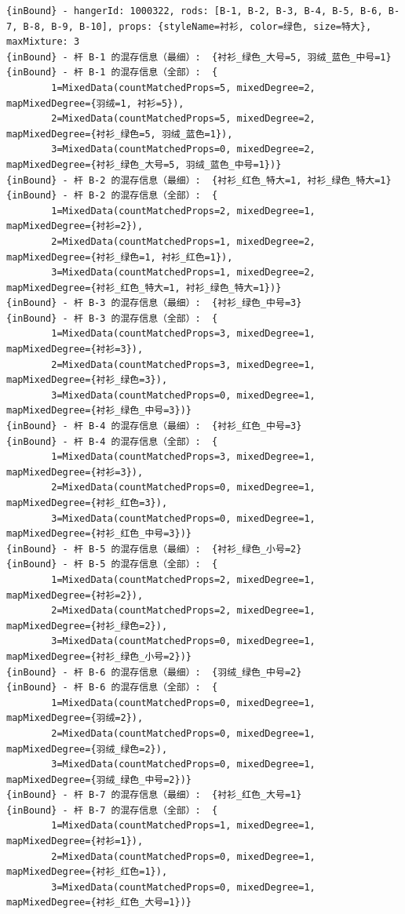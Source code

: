 {\begin{verbatim}
{inBound} - hangerId: 1000322, rods: [B-1, B-2, B-3, B-4, B-5, B-6, B-7, B-8, B-9, B-10], props: {styleName=衬衫, color=绿色, size=特大}, maxMixture: 3
{inBound} - 杆 B-1 的混存信息（最细）:  {衬衫_绿色_大号=5, 羽绒_蓝色_中号=1}
{inBound} - 杆 B-1 的混存信息（全部）:  {
		1=MixedData(countMatchedProps=5, mixedDegree=2, mapMixedDegree={羽绒=1, 衬衫=5}), 
		2=MixedData(countMatchedProps=5, mixedDegree=2, mapMixedDegree={衬衫_绿色=5, 羽绒_蓝色=1}), 
		3=MixedData(countMatchedProps=0, mixedDegree=2, mapMixedDegree={衬衫_绿色_大号=5, 羽绒_蓝色_中号=1})}
{inBound} - 杆 B-2 的混存信息（最细）:  {衬衫_红色_特大=1, 衬衫_绿色_特大=1}
{inBound} - 杆 B-2 的混存信息（全部）:  {
		1=MixedData(countMatchedProps=2, mixedDegree=1, mapMixedDegree={衬衫=2}), 
		2=MixedData(countMatchedProps=1, mixedDegree=2, mapMixedDegree={衬衫_绿色=1, 衬衫_红色=1}), 
		3=MixedData(countMatchedProps=1, mixedDegree=2, mapMixedDegree={衬衫_红色_特大=1, 衬衫_绿色_特大=1})}
{inBound} - 杆 B-3 的混存信息（最细）:  {衬衫_绿色_中号=3}
{inBound} - 杆 B-3 的混存信息（全部）:  {
		1=MixedData(countMatchedProps=3, mixedDegree=1, mapMixedDegree={衬衫=3}), 
		2=MixedData(countMatchedProps=3, mixedDegree=1, mapMixedDegree={衬衫_绿色=3}), 
		3=MixedData(countMatchedProps=0, mixedDegree=1, mapMixedDegree={衬衫_绿色_中号=3})}
{inBound} - 杆 B-4 的混存信息（最细）:  {衬衫_红色_中号=3}
{inBound} - 杆 B-4 的混存信息（全部）:  {
		1=MixedData(countMatchedProps=3, mixedDegree=1, mapMixedDegree={衬衫=3}), 
		2=MixedData(countMatchedProps=0, mixedDegree=1, mapMixedDegree={衬衫_红色=3}), 
		3=MixedData(countMatchedProps=0, mixedDegree=1, mapMixedDegree={衬衫_红色_中号=3})}
{inBound} - 杆 B-5 的混存信息（最细）:  {衬衫_绿色_小号=2}
{inBound} - 杆 B-5 的混存信息（全部）:  {
		1=MixedData(countMatchedProps=2, mixedDegree=1, mapMixedDegree={衬衫=2}), 
		2=MixedData(countMatchedProps=2, mixedDegree=1, mapMixedDegree={衬衫_绿色=2}), 
		3=MixedData(countMatchedProps=0, mixedDegree=1, mapMixedDegree={衬衫_绿色_小号=2})}
{inBound} - 杆 B-6 的混存信息（最细）:  {羽绒_绿色_中号=2}
{inBound} - 杆 B-6 的混存信息（全部）:  {
		1=MixedData(countMatchedProps=0, mixedDegree=1, mapMixedDegree={羽绒=2}), 
		2=MixedData(countMatchedProps=0, mixedDegree=1, mapMixedDegree={羽绒_绿色=2}), 
		3=MixedData(countMatchedProps=0, mixedDegree=1, mapMixedDegree={羽绒_绿色_中号=2})}
{inBound} - 杆 B-7 的混存信息（最细）:  {衬衫_红色_大号=1}
{inBound} - 杆 B-7 的混存信息（全部）:  {
		1=MixedData(countMatchedProps=1, mixedDegree=1, mapMixedDegree={衬衫=1}), 
		2=MixedData(countMatchedProps=0, mixedDegree=1, mapMixedDegree={衬衫_红色=1}), 
		3=MixedData(countMatchedProps=0, mixedDegree=1, mapMixedDegree={衬衫_红色_大号=1})}

\end{verbatim}}
